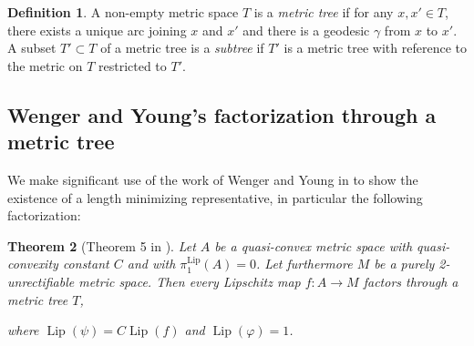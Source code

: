 \documentclass{article}
\newtheorem{theorem}{Theorem}[section]
\theoremstyle{definition}
\newtheorem{definition}[theorem]{Definition}
\theoremstyle{remark}
\newcommand{\pilip}[1]{\pi_{#1}^{\text{Lip}}}
\DeclareMathOperator{\Lip}{Lip}
\begin{document}
\begin{definition}
A non-empty metric space $T$ is a \textit{metric tree} if for any $x,x'\in T$, there exists a unique arc joining $x$ and $x'$ and there is a geodesic $\gamma$ from $x$ to $x'$. A subset $T'\subset T$ of a metric tree is a \textit{subtree} if $T'$ is a metric tree with reference to the metric on $T$ restricted to $T'$.
\end{definition}


\subsection{Wenger and Young's factorization through a metric tree}



We make significant use of the work of Wenger and Young in \cite{Weg} to show the existence of a length minimizing representative, in particular the following factorization:

\begin{theorem}[Theorem 5 in \cite{Weg}]\label{Wenger and Young}
Let $A$ be a quasi-convex metric space with quasi-convexity constant $C$ and with $\pilip{1}(A)=0$. Let furthermore $M$ be a purely 2-unrectifiable metric space. Then every Lipschitz map $f:A\rightarrow M$ factors through a metric tree $T$,
\begin{center}
\end{center}
where $\Lip(\psi)=C\Lip(f)$ and $\Lip(\varphi)=1$. 
\end{theorem} 


%
\end{document}
